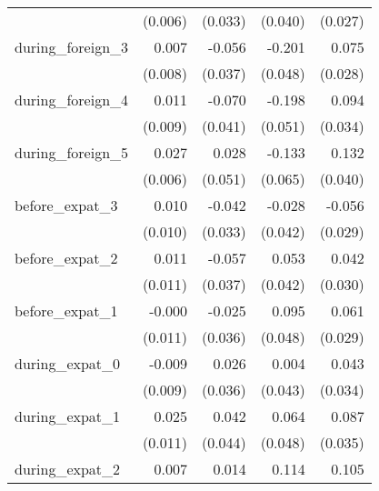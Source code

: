 {\begin{tabular}{l*{4}{D{.}{.}{-1}}}
            &     (0.006)         &     (0.033)         &     (0.040)         &     (0.027)         \\
[1em]
during\_foreign\_3&       0.007         &      -0.056         &      -0.201\sym{***}&       0.075\sym{***}\\
            &     (0.008)         &     (0.037)         &     (0.048)         &     (0.028)         \\
[1em]
during\_foreign\_4&       0.011         &      -0.070\sym{*}  &      -0.198\sym{***}&       0.094\sym{***}\\
            &     (0.009)         &     (0.041)         &     (0.051)         &     (0.034)         \\
[1em]
during\_foreign\_5&       0.027\sym{***}&       0.028         &      -0.133\sym{**} &       0.132\sym{***}\\
            &     (0.006)         &     (0.051)         &     (0.065)         &     (0.040)         \\
[1em]
before\_expat\_3&       0.010         &      -0.042         &      -0.028         &      -0.056\sym{*}  \\
            &     (0.010)         &     (0.033)         &     (0.042)         &     (0.029)         \\
[1em]
before\_expat\_2&       0.011         &      -0.057         &       0.053         &       0.042         \\
            &     (0.011)         &     (0.037)         &     (0.042)         &     (0.030)         \\
[1em]
before\_expat\_1&      -0.000         &      -0.025         &       0.095\sym{**} &       0.061\sym{**} \\
            &     (0.011)         &     (0.036)         &     (0.048)         &     (0.029)         \\
[1em]
during\_expat\_0&      -0.009         &       0.026         &       0.004         &       0.043         \\
            &     (0.009)         &     (0.036)         &     (0.043)         &     (0.034)         \\
[1em]
during\_expat\_1&       0.025\sym{**} &       0.042         &       0.064         &       0.087\sym{**} \\
            &     (0.011)         &     (0.044)         &     (0.048)         &     (0.035)         \\
[1em]
during\_expat\_2&       0.007         &       0.014         &       0.114\sym{*}  &       0.105\sym{***}\\

\end{tabular}}
